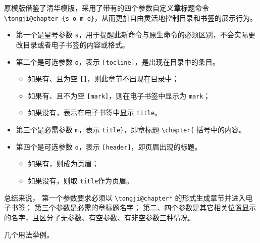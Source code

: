 \documentclass[../Main/thesis.tex]{subfiles}
\begin{document}
原模版借鉴了清华模版，采用了带有的四个参数自定义\textbf{章}标题命令 \texttt{\textbackslash{}tongji@chapter \{s\ o\ m\ o\}}，从而更加自由灵活地控制目录和书签的展示行为。

\begin{itemize}
\item 第一个是星号参数 \texttt{s}，用于提醒此新命令与原生命令的必须区别，不会实际更改目录或者电子书签的内容或格式。
\item 第二个是可选参数 \texttt{o}，表示 \texttt{[tocline]}，是出现在目录中的条目。
\begin{itemize}
  \item 如果有、且为空 \texttt{[]}，则此章节不出现在目录中；
  \item 如果有、且不为空 \texttt{[mark]}，则在电子书签中显示为 \texttt{mark}；
  \item 如果没有，表示在电子书签中显示 \texttt{title}。
  \end{itemize}
\item 第三个是必需参数 \texttt{m}，表示 \texttt{title\}}，即章标题 \texttt{\textbackslash{}chapter\{} 括号中的内容。
\item 第四个是可选参数 \texttt{o}，表示 \texttt{[header]}，即页眉出现的标题。
\begin{itemize}
  \item 如果有，则成为页眉；
  \item 如果没有，则取 \texttt{title}作为页眉。
\end{itemize}
\end{itemize}

总结来说， 第一个参数要求必须以 \texttt{\textbackslash{}tongji@chapter*}
的形式生成章节并进入电子书签； 第三个参数是必需的章标题名字；
第二、四个参数是其它相关位置显示的名字，且区分了无参数、有空参数、有非空参数三种情况。

几个用法举例。
\end{document}
